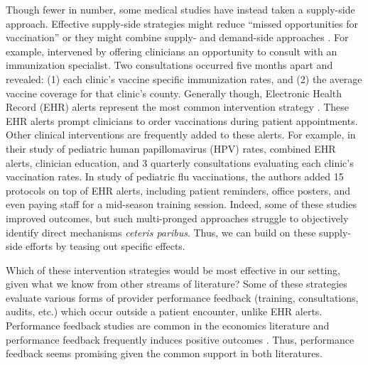 \begin{onehalfspace}
 Though fewer in number, some medical studies have instead taken a supply-side approach. Effective supply-side strategies might reduce “missed opportunities for vaccination” \citep{Jaca2018} or they might combine supply- and demand-side approaches \citep{Smulian2016}. For example, \cite{Gilkey2014} intervened by offering clinicians an opportunity to consult with an immunization specialist. Two consultations occurred five months apart and revealed: (1) each clinic’s vaccine specific immunization rates, and (2) the average vaccine coverage for that clinic’s county. Generally though, Electronic Health Record (EHR) alerts represent the most common intervention strategy \citep{Fiks2009,Fiks2013,Zimmerman2014,Szilagyi2015,RuffinIV2015,Lin2016,Patel2017}. These EHR alerts prompt clinicians to order vaccinations during patient appointments. Other clinical interventions are frequently added to these alerts. For example, in their study of pediatric human papillomavirus (HPV) rates, \cite{Fiks2013} combined EHR alerts, clinician education, and 3 quarterly consultations evaluating each clinic’s vaccination rates. In \cite{Zimmerman2014} study of pediatric flu vaccinations, the authors added 15 protocols on top of EHR alerts, including patient reminders, office posters, and even paying staff for a mid-season training session. Indeed, some of these studies improved outcomes, but such multi-pronged approaches struggle to objectively identify direct mechanisms \textit{ceteris paribus}. Thus, we can build on these supply-side efforts by teasing out specific effects.
	
 Which of these intervention strategies would be most effective in our setting, given what we know from other streams of literature? Some of these strategies evaluate various forms of provider performance feedback (training, consultations, audits, etc.) which occur outside a patient encounter, unlike EHR alerts. Performance feedback studies are common in the economics literature \citep[see reviews in][]{Dechenaux2015,Schnieder2019} and performance feedback frequently induces positive outcomes \citep{Casas-Arce2009,Azmat2010,Blanes-i-Vidal2011,Delfgaauw2013,Song2018a}. Thus, performance feedback seems promising given the common support in both literatures.
	

\end{onehalfspace}

